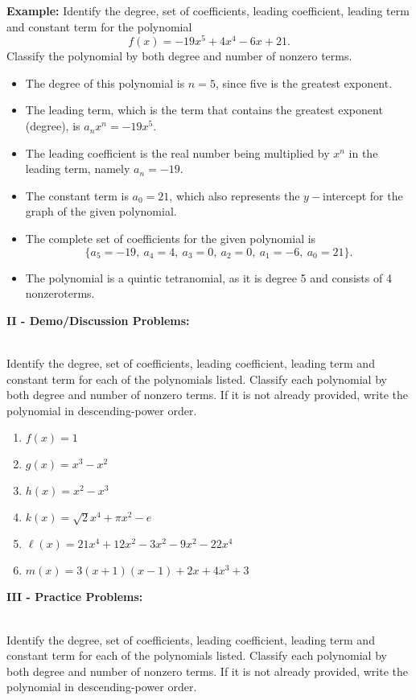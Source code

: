 \documentclass[12pt]{article}
\theoremstyle{definition}
\begin{document}
{\bf Example:} Identify the degree, set of coefficients, leading coefficient, leading term and constant term for the polynomial
$$f(x) = -19x^5+4x^4-6x+21.$$
Classify the polynomial by both degree and number of nonzero terms.
\begin{itemize}
	\item The degree of this polynomial is $n=5$, since five is the greatest exponent.
	\item The leading term, which is the term that contains the greatest exponent (degree), is $a_nx^n=-19x^5$.
	\item The leading coefficient is the real number being multiplied by $x^n$ in the leading term, namely $a_n=-19$.
	\item The constant term is $a_0=21$, which also represents the $y-$intercept for the graph of the given polynomial.
	\item The complete set of coefficients for the given polynomial is
$$\{a_5=-19, \ a_4=4, \ a_3=0, \ a_2=0, \ a_1=-6, \ a_0=21\}.$$
	\item The polynomial is a quintic tetranomial, as it is degree 5 and consists of 4 nonzeroterms.
\end{itemize}
{\bf II - Demo/Discussion Problems:}\\
\ \par
Identify the degree, set of coefficients, leading coefficient, leading term and constant term for each of the polynomials listed.  Classify each polynomial by both degree and number of nonzero terms.  If it is not already provided, write the polynomial in descending-power order.
\begin{multicols}{2}
\begin{enumerate}
\item $f(x)=1$
\item $g(x) = x^3-x^2$
\item $h(x) = x^2-x^3$
\item $k(x)=\sqrt{2}x^4+\pi x^2-e$
\item $\ell(x) = 21x^4+12x^2-3x^2-9x^2-22x^4$
\item $m(x)=3(x+1)(x-1)+2x+4x^3+3$
\end{enumerate}
\end{multicols}
{\bf III - Practice Problems:}\\
\ \par
Identify the degree, set of coefficients, leading coefficient, leading term and constant term for each of the polynomials listed.  Classify each polynomial by both degree and number of nonzero terms.  If it is not already provided, write the polynomial in descending-power order.
\end{document}
